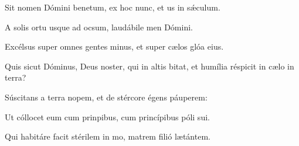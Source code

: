 \item {}

\item Sit nomen Dómini benetum,\psstar{} ex hoc nunc, et us in sǽculum.

\item A solis ortu usque ad ocsum,\psstar{} laudábile men Dómini.

\item Excélsus super omnes gentes minus,\psstar{} et super cælos glóa eius.

\item Quis sicut Dóminus, Deus noster, qui in altis bitat,\psstar{} et humília réspicit in cælo  in terra?

\item Súscitans a terra nopem,\psstar{} et de stércore égens páuperem:

\item Ut cóllocet eum cum prinpibus,\psstar{} cum princípibus póli sui.

\item Qui habitáre facit stérilem in mo,\psstar{} matrem filió lætántem.